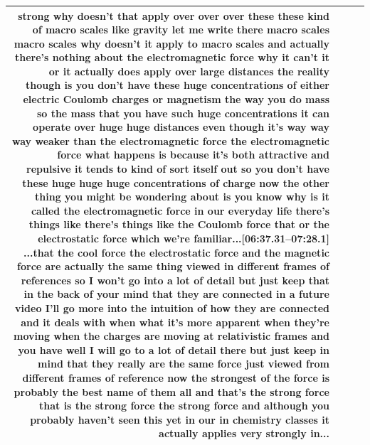 \documentclass[10pt]{article}
\begin{document}
\begin{tiny}
\begin{longtable}{|r|p{0.375in}|p{1.275in}|p{3.5in}|}
strong why doesn't that apply over over over these these kind of macro scales like gravity let me write there macro scales macro scales why doesn't it apply to macro scales and actually there's nothing about the electromagnetic force why it can't it or it actually does apply over large distances the reality though is you don't have these huge concentrations of either electric Coulomb charges or magnetism the way you do mass so the mass that you have such huge concentrations it can operate over huge huge distances even though it's way way way weaker than the electromagnetic force the electromagnetic force what happens is because it's both attractive and repulsive it tends to kind of sort itself out so you don't have these huge huge huge concentrations of charge now the other thing you might be wondering about is you know why is it called the electromagnetic force in our everyday life there's things like there's things like the Coulomb force that or the electrostatic force which we're familiar...\newline\textbf{[06:37.31--07:28.1]} ...that the cool force the electrostatic force and the magnetic force are actually the same thing viewed in different frames of references so I won't go into a lot of detail but just keep that in the back of your mind that they are connected in a future video I'll go more into the intuition of how they are connected and it deals with when what it's more apparent when they're moving when the charges are moving at relativistic frames and you have well I will go to a lot of detail there but just keep in mind that they really are the same force just viewed from different frames of reference now the strongest of the force is probably the best name of them all and that's the strong force that is the strong force the strong force and although you probably haven't seen this yet in our in chemistry classes it actually applies very strongly in... \\\hline

\end{longtable}
\end{tiny}
\end{document}
